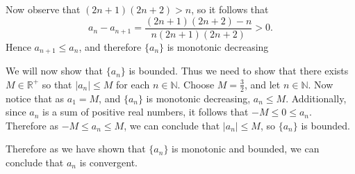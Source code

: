\documentclass{article}
\begin{document}
Now observe that $(2n+1)(2n+2)>n$, so it follows that 
$$a_n-a_{n+1}=\frac{(2n+1)(2n+2)-n}{n(2n+1)(2n+2)}>0.$$
Hence $a_{n+1} \leq a_n$, and therefore $\{a_n\}$ is monotonic decreasing

We will now show that $\{a_n\}$ is bounded. Thus we need to show that there exists $M \in \mathbb{R}^+$ so that $|a_n| \leq M$ for each $n \in \mathbb{N}$. Choose $M=\frac{3}{2}$, and let $n \in \mathbb{N}$. Now notice that as $a_1=M$, and $\{a_n\}$ is monotonic decreasing, $a_n \leq M$. Additionally, since $a_n$ is a sum of positive real numbers, it follows that $-M \leq 0 \leq a_n$. Therefore as $-M \leq a_n \leq M$, we can conclude that $|a_n| \leq M$, so $\{a_n\}$ is bounded.

Therefore as we have shown that $\{a_n\}$ is monotonic and bounded, we can conclude that $a_n$ is convergent.\\
\end{document}
